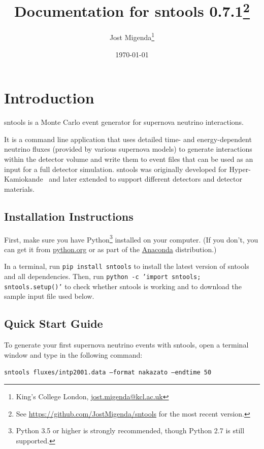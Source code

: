 \documentclass[11pt, oneside]{article}
\title{Documentation for sntools 0.7.1\footnote{See \url{https://github.com/JostMigenda/sntools} for the most recent version.}}
\author{Jost Migenda\footnote{King’s College London, \url{jost.migenda@kcl.ac.uk}}}
\date{\today}
\begin{document}
\maketitle
\setcounter{tocdepth}{2}
\tableofcontents
\clearpage


\section{Introduction}

sntools is a Monte Carlo event generator for supernova neutrino interactions.

It is a command line application that uses detailed time- and energy-dependent neutrino fluxes (provided by various supernova models) to generate interactions within the detector volume and write them to event files that can be used as an input for a full detector simulation.
sntools was originally developed for Hyper-Kamiokande~\cite{Migenda2019} and later extended to support different detectors and detector materials.


\subsection{Installation Instructions}

First, make sure you have Python\footnote{Python 3.5 or higher is strongly recommended, though Python 2.7 is still supported.} installed on your computer.
(If you don’t, you can get it from \href{https://www.python.org}{python.org} or as part of the \href{https://www.anaconda.com/products/individual}{Anaconda} distribution.)

In a terminal, run \texttt{pip install sntools} to install the latest version of sntools and all dependencies.
Then, run \texttt{python -c 'import sntools; sntools.setup()'} to check whether sntools is working and to download the sample input file used below.


\subsection{Quick Start Guide}

To generate your first supernova neutrino events with sntools, open a terminal window and type in the following command:

\texttt{sntools fluxes/intp2001.data --format nakazato --endtime 50}
\end{document}
